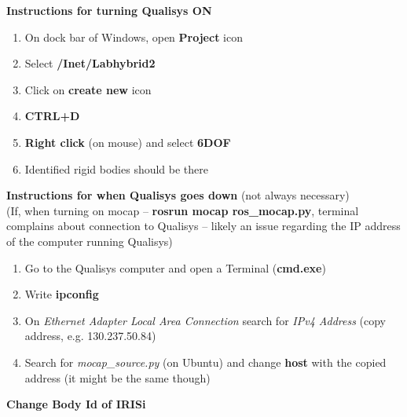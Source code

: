 \vspace{1cm}

\textbf{Instructions for turning Qualisys ON}

\begin{enumerate}
	
	\item On dock bar of Windows, open \textbf{Project} icon
	
	\item Select \textbf{/Inet/Labhybrid2}
	
	\item Click on \textbf{create new} icon
	
	\item \textbf{CTRL+D}
	
	\item \textbf{Right click} (on mouse) and select \textbf{6DOF}
	 
	\item Identified rigid bodies should be there
	
\end{enumerate}

\vspace{1cm}

\textbf{Instructions for when Qualisys goes down} (not always necessary)\\
(If, when turning on mocap -- \textbf{rosrun mocap ros\_mocap.py}, terminal complains about connection to Qualisys -- likely an issue regarding the IP address of the computer running Qualisys)

\begin{enumerate}
	
	\item Go to the Qualisys computer and open a Terminal (\textbf{cmd.exe})
	
	\item Write \textbf{ipconfig}
	
	\item On \textit{Ethernet Adapter Local Area Connection} search for \textit{IPv4 Address} (copy address, e.g. 130.237.50.84)

	\item Search for \textit{mocap\_source.py} (on Ubuntu) and change \textbf{host} with the copied address (it might be the same though)
	
\end{enumerate}

\vspace{1cm}

\textbf{Change Body Id of IRIS\textbf{i}}

